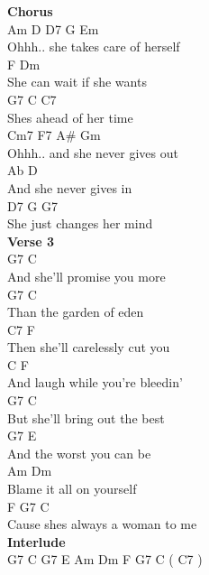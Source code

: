 \documentclass[a4paper]{article}
\begin{document}
{{        }
        \textbf{Chorus}
        ~\\
        {
            \cutive
            \obeyspaces
Am     D           D7          G     Em
\\
Ohhh..  she takes care of herself
\\
                      F     Dm
\\
She can wait if she wants
\\
       G7          C     C7
\\
Shes ahead of her time
\\
Cm7   F7                    A\#   Gm
\\
Ohhh.. and she never gives out
\\
                    Ab    D
\\
And she never gives in
\\
            D7         G     G7
\\
She just changes her mind
\\

        }
        \textbf{Verse 3}
        ~\\
        {
            \cutive
            \obeyspaces
            G7         C
\\
And she'll promise you more
\\
            G7        C
\\
Than the garden of eden
\\
               C7        F
\\
Then she'll carelessly cut you
\\
       C               F
\\
And laugh while you're bleedin'
\\
            G7           C
\\
But she'll bring out the best
\\
          G7           E
\\
And the worst you can be
\\
          Am          Dm
\\
Blame it all on yourself
\\
             F        G7      C
\\
Cause shes always a woman to me
\\

        }
        \textbf{Interlude}
        ~\\
        {
            \cutive
            \obeyspaces
 G7  C  G7  E  Am  Dm  F  G7  C  ( C7 )
\\

}}
\end{document}
